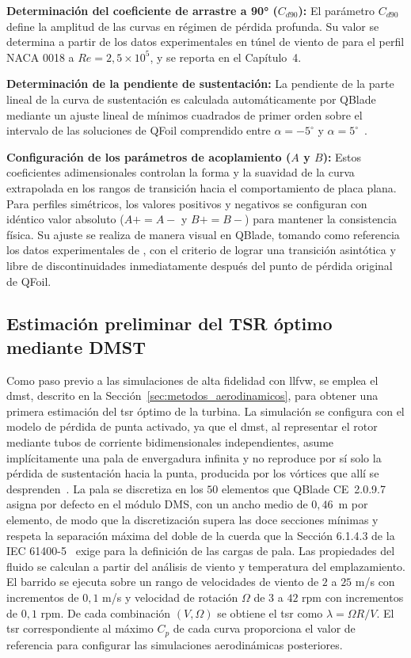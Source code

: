 \textbf{Determinación del coeficiente de arrastre a 90° ($C_{d90}$):} El parámetro $C_{d90}$ define la amplitud de las curvas en régimen de pérdida profunda. Su valor se determina a partir de los datos experimentales en túnel de viento de \textcite{Bianchini2015} para el perfil NACA 0018 a $Re = 2{,}5 \times 10^5$, y se reporta en el Capítulo~4.

\textbf{Determinación de la pendiente de sustentación:} La pendiente de la parte lineal de la curva de sustentación es calculada automáticamente por QBlade mediante un ajuste lineal de mínimos cuadrados de primer orden sobre el intervalo de las soluciones de QFoil comprendido entre $\alpha = -5^\circ$ y $\alpha = 5^\circ$~\parencite{marten2019qblade}.

\textbf{Configuración de los parámetros de acoplamiento ($A$ y $B$):} Estos coeficientes adimensionales controlan la forma y la suavidad de la curva extrapolada en los rangos de transición hacia el comportamiento de placa plana. Para perfiles simétricos, los valores positivos y negativos se configuran con idéntico valor absoluto ($A+ = A-$ y $B+ = B-$) para mantener la consistencia física. Su ajuste se realiza de manera visual en QBlade, tomando como referencia los datos experimentales de \textcite{Bianchini2015}, con el criterio de lograr una transición asintótica y libre de discontinuidades inmediatamente después del punto de pérdida original de QFoil.

\subsection{Estimación preliminar del TSR óptimo mediante DMST}
\label{sec:dmst}

Como paso previo a las simulaciones de alta fidelidad con \gls{llfvw}, se emplea el \gls{dmst}, descrito en la Sección~\ref{sec:metodos_aerodinamicos}, para obtener una primera estimación del \gls{tsr} óptimo de la turbina. La simulación se configura con el modelo de pérdida de punta activado, ya que el \gls{dmst}, al representar el rotor mediante tubos de corriente bidimensionales independientes, asume implícitamente una pala de envergadura infinita y no reproduce por sí solo la pérdida de sustentación hacia la punta, producida por los vórtices que allí se desprenden~\parencite{marten2019qblade}. La pala se discretiza en los $50$ elementos que QBlade CE~2.0.9.7 asigna por defecto en el módulo DMS, con un ancho medio de $0{,}46$~m por elemento, de modo que la discretización supera las doce secciones mínimas y respeta la separación máxima del doble de la cuerda que la Sección 6.1.4.3 de la IEC 61400-5~\parencite*{IEC61400-5} exige para la definición de las cargas de pala. Las propiedades del fluido se calculan a partir del análisis de viento y temperatura del emplazamiento. El barrido se ejecuta sobre un rango de velocidades de viento de $2$ a $25$ m/s con incrementos de $0{,}1$ m/s y velocidad de rotación $\Omega$ de $3$ a $42$ rpm con incrementos de $0{,}1$ rpm. De cada combinación $(V, \Omega)$ se obtiene el \gls{tsr} como $\lambda = \Omega R / V$. El \gls{tsr} correspondiente al máximo $C_p$ de cada curva proporciona el valor de referencia para configurar las simulaciones aerodinámicas posteriores.

